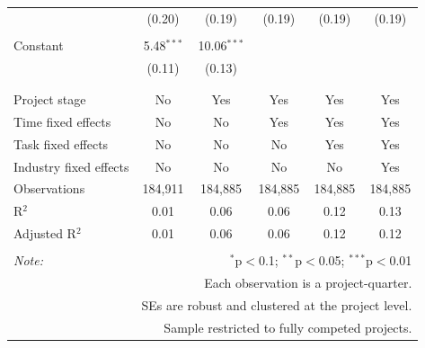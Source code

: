 \documentclass[
]{article}
\begin{document}
\begin{table}[H]
\begin{tabular}{@{\extracolsep{-2pt}}lccccc}
  & (0.20) & (0.19) & (0.19) & (0.19) & (0.19) \\ 
  & & & & & \\ 
 Constant & 5.48$^{***}$ & 10.06$^{***}$ &  &  &  \\ 
  & (0.11) & (0.13) &  &  &  \\ 
  & & & & & \\ 
\hline \\[-1.8ex] 
Project stage & No & Yes & Yes & Yes & Yes \\ 
Time fixed effects & No & No & Yes & Yes & Yes \\ 
Task fixed effects & No & No & No & Yes & Yes \\ 
Industry fixed effects & No & No & No & No & Yes \\ 
Observations & 184,911 & 184,885 & 184,885 & 184,885 & 184,885 \\ 
R$^{2}$ & 0.01 & 0.06 & 0.06 & 0.12 & 0.13 \\ 
Adjusted R$^{2}$ & 0.01 & 0.06 & 0.06 & 0.12 & 0.12 \\ 
\hline 
\hline \\[-1.8ex] 
\textit{Note:}  & \multicolumn{5}{r}{$^{*}$p$<$0.1; $^{**}$p$<$0.05; $^{***}$p$<$0.01} \\ 
 & \multicolumn{5}{r}{Each observation is a project-quarter.} \\ 
 & \multicolumn{5}{r}{SEs are robust and clustered at the project level.} \\ 
 & \multicolumn{5}{r}{Sample restricted to fully competed projects.} \\ 
\end{tabular} 
\end{table}
\end{document}
